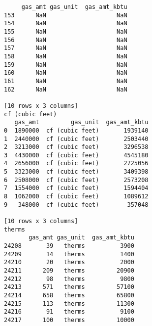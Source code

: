 \documentclass[12pt]{article}
\begin{document}
\begin{verbatim}
     gas_amt gas_unit  gas_amt_kbtu
153      NaN                    NaN
154      NaN                    NaN
155      NaN                    NaN
156      NaN                    NaN
157      NaN                    NaN
158      NaN                    NaN
159      NaN                    NaN
160      NaN                    NaN
161      NaN                    NaN
162      NaN                    NaN

[10 rows x 3 columns]
cf (cubic feet)
   gas_amt         gas_unit  gas_amt_kbtu
0  1890000  cf (cubic feet)       1939140
1  2440000  cf (cubic feet)       2503440
2  3213000  cf (cubic feet)       3296538
3  4430000  cf (cubic feet)       4545180
4  2656000  cf (cubic feet)       2725056
5  3323000  cf (cubic feet)       3409398
6  2508000  cf (cubic feet)       2573208
7  1554000  cf (cubic feet)       1594404
8  1062000  cf (cubic feet)       1089612
9   348000  cf (cubic feet)        357048

[10 rows x 3 columns]
therms
       gas_amt gas_unit  gas_amt_kbtu
24208       39   therms          3900
24209       14   therms          1400
24210       20   therms          2000
24211      209   therms         20900
24212       98   therms          9800
24213      571   therms         57100
24214      658   therms         65800
24215      113   therms         11300
24216       91   therms          9100
24217      100   therms         10000

\end{verbatim}
\end{document}
